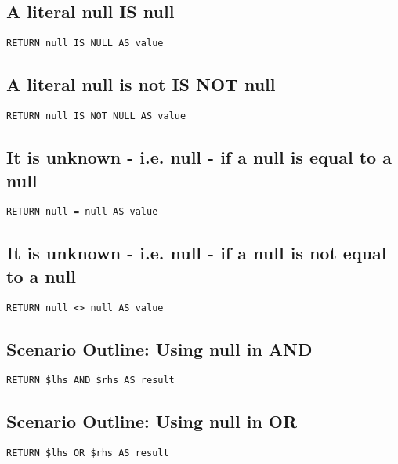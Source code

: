 \subsection{A literal null IS null}

\begin{lstlisting}
RETURN null IS NULL AS value
\end{lstlisting}

\subsection{A literal null is not IS NOT null}

\begin{lstlisting}
RETURN null IS NOT NULL AS value
\end{lstlisting}

\subsection{It is unknown - i.e. null - if a null is equal to a null}

\begin{lstlisting}
RETURN null = null AS value
\end{lstlisting}

\subsection{It is unknown - i.e. null - if a null is not equal to a null}

\begin{lstlisting}
RETURN null <> null AS value
\end{lstlisting}

\subsection{Scenario Outline: Using null in AND}

\begin{lstlisting}
RETURN $lhs AND $rhs AS result
\end{lstlisting}

\subsection{Scenario Outline: Using null in OR}

\begin{lstlisting}
RETURN $lhs OR $rhs AS result
\end{lstlisting}

